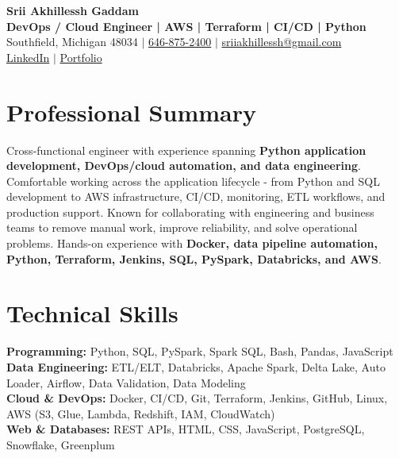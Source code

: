 \documentclass[letterpaper,10pt]{article}
\begin{document}
\fontsize{9.35pt}{10.45pt}\selectfont

\begin{center}
    {\LARGE \textbf{Srii Akhillessh Gaddam}} \\[-1pt]
    \textbf{DevOps / Cloud Engineer | AWS | Terraform | CI/CD | Python} \\[2pt]
    Southfield, Michigan 48034 $|$
    \href{tel:6468752400}{646-875-2400} $|$
    \href{mailto:sriiakhillessh@gmail.com}{sriiakhillessh@gmail.com} \\[1pt]
    \href{https://www.linkedin.com/in/srii-akhiilessh-gaddam-b48668191/}{LinkedIn} $|$
    \href{https://sriiakhillesshg.github.io/portfolio/}{Portfolio}
\end{center}
\vspace{-8pt}

\section{Professional Summary}
\small{Cross-functional engineer with experience spanning \textbf{Python application development, DevOps/cloud automation, and data engineering}. Comfortable working across the application lifecycle - from Python and SQL development to AWS infrastructure, CI/CD, monitoring, ETL workflows, and production support. Known for collaborating with engineering and business teams to remove manual work, improve reliability, and solve operational problems. Hands-on experience with \textbf{Docker, data pipeline automation, Python, Terraform, Jenkins, SQL, PySpark, Databricks, and AWS}.}

\section{Technical Skills}
\small{
\textbf{Programming:} Python, SQL, PySpark, Spark SQL, Bash, Pandas, JavaScript \\
\textbf{Data Engineering:} ETL/ELT, Databricks, Apache Spark, Delta Lake, Auto Loader, Airflow, Data Validation, Data Modeling \\
\textbf{Cloud \& DevOps:} Docker, CI/CD, Git, Terraform, Jenkins, GitHub, Linux, AWS (S3, Glue, Lambda, Redshift, IAM, CloudWatch) \\
\textbf{Web \& Databases:} REST APIs, HTML, CSS, JavaScript, PostgreSQL, Snowflake, Greenplum
}
\end{document}
